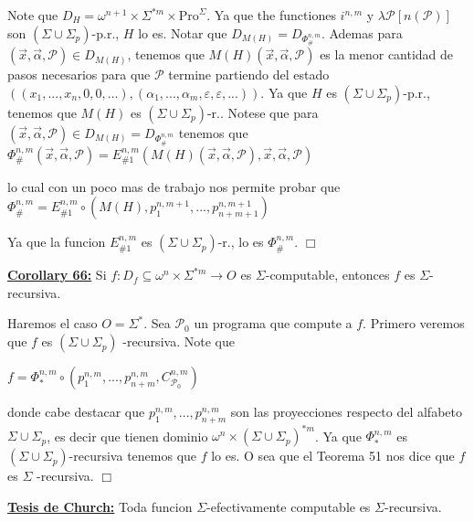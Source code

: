 Note que \(D_{H}=\omega ^{n+1}\times \Sigma ^{\ast m}\times \mathrm{Pro} ^{\Sigma }\). Ya que the functiones \(i^{n,m}\) y \(\lambda \mathcal{P}\left[ n( \mathcal{P})\right] \) son \((\Sigma \cup \Sigma _{p})\)-p.r., \(H\) lo es. Notar que \(D_{M(H)}=D_{\Phi _{\#}^{n,m}}\). Ademas para \((\vec{x},\vec{\alpha}, \mathcal{P})\in D_{M(H)}\), tenemos que \(M(H)(\vec{x},\vec{\alpha},\mathcal{P} )\) es la menor cantidad de pasos necesarios para que \(\mathcal{P}\) termine partiendo del estado \(((x_{1},...,x_{n},0,0,...),(\alpha _{1},...,\alpha _{m},\varepsilon ,\varepsilon ,...))\). Ya que \(H\) es \((\Sigma \cup \Sigma _{p})\)-p.r., tenemos que \(M(H)\) es \((\Sigma \cup \Sigma _{p})\)-r.. Notese que para \((\vec{x},\vec{\alpha},\mathcal{P})\in D_{M(H)}=D_{\Phi _{\#}^{n,m}} \) tenemos que
\(\displaystyle \Phi _{\#}^{n,m}(\vec{x},\vec{\alpha},\mathcal{P})=E_{\#1}^{n,m}\left( M(H)( \vec{x},\vec{\alpha},\mathcal{P}),\vec{x},\vec{\alpha},\mathcal{P}\right) \)

lo cual con un poco mas de trabajo nos permite probar que
\(\displaystyle \Phi _{\#}^{n,m}=E_{\#1}^{n,m}\circ \left( M(H),p_{1}^{n,m+1},...,p_{n+m+1}^{n,m+1}\right) \)

Ya que la funcion \(E_{\#1}^{n,m}\) es \((\Sigma \cup \Sigma _{p})\)-r., lo es \( \Phi _{\#}^{n,m}\). \(\Box\)



\textbf{\underline{Corollary 66:}} Si \(f:D_{f}\subseteq \omega ^{n}\times \Sigma ^{\ast m}\rightarrow O\) es \( \Sigma \)-computable, entonces \(f\) es \(\Sigma \)-recursiva.

\PROOF Haremos el caso \(O=\Sigma ^{\ast }\). Sea \(\mathcal{P}_{0}\) un programa que compute a \(f\). Primero veremos que \(f\) es \((\Sigma \cup \Sigma _{p})\) -recursiva. Note que

\(\displaystyle f=\Phi _{\ast }^{n,m}\circ \left( p_{1}^{n,m},...,p_{n+m}^{n,m},C_{\mathcal{P }_{0}}^{n,m}\right) \)

donde cabe destacar que \(p_{1}^{n,m},...,p_{n+m}^{n,m}\) son las proyecciones respecto del alfabeto \(\Sigma \cup \Sigma _{p}\), es decir que tienen dominio \(\omega ^{n}\times (\Sigma \cup \Sigma _{p})^{\ast m}\). Ya que \(\Phi _{\ast }^{n,m}\) es \((\Sigma \cup \Sigma _{p})\)-recursiva tenemos que \(f\) lo es. O sea que el Teorema 51 nos dice que \(f\) es \(\Sigma \) -recursiva. \(\Box\)


\textbf{\underline{Tesis de Church:}} Toda funcion \(\Sigma \)-efectivamente computable es \(\Sigma \)-recursiva.


